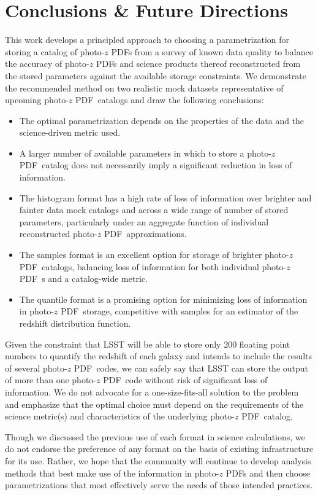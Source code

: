 \documentclass[\docopts]{\docclass}
\newcommand{\pz}{photo-$z$ PDF}
\begin{document}
\section{Conclusions \& Future Directions}
\label{sec:conclusions}


This work develops a principled approach to choosing a parametrization for 
storing a catalog of \pz s from a survey of known data quality to balance the 
accuracy of \pz s and science products thereof reconstructed from the stored 
parameters against the available storage constraints.
We demonstrate the recommended method on two realistic mock datasets 
representative of upcoming \pz\ catalogs and draw the following conclusions:
\begin{itemize}
  \item The optimal parametrization depends on the properties of the data and 
the science-driven metric used.
  \item A larger number of available parameters in which to store a \pz\ 
catalog does not necessarily imply a significant reduction in loss of 
information.
  \item The histogram format has a high rate of loss of information over 
brighter and fainter data mock catalogs and across a wide range of number of 
stored parameters, particularly under an aggregate function of individual 
reconstructed \pz\ approximations.
  \item The samples format is an excellent option for storage of brighter \pz\ 
catalogs, balancing loss of information for both individual \pz\ s and a 
catalog-wide metric.
  \item The quantile format is a promising option for minimizing loss of 
information in \pz\ storage, competitive with samples for an estimator of the 
redshift distribution function.
\end{itemize}

Given the constraint that LSST will be able to store only 200 floating point 
numbers to quantify the redshift of each galaxy and intends to include the 
results of several \pz\ codes, we can safely say that LSST can store the output 
of more than one \pz\ code without risk of significant loss of information.
We do not advocate for a one-size-fits-all solution to the problem and 
emphasize that the optimal choice must depend on the requirements of the 
science metric(s) and characteristics of the underlying \pz\ catalog.

Though we discussed the previous use of each format in science calculations, we 
do not endorse the preference of any format on the basis of existing 
infrastructure for its use.
Rather, we hope that the community will continue to develop analysis methods 
that best make use of the information in \pz s and then choose parametrizations 
that most effectively serve the needs of those intended practices.
\end{document}
